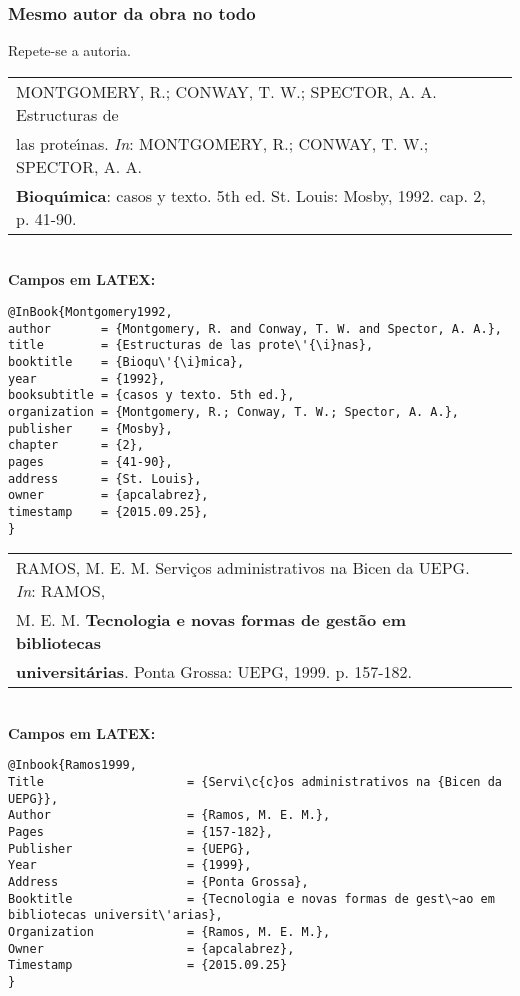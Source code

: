 \subsubsection{Mesmo autor da obra no todo}

Repete-se a autoria. \\

\begin{tabular}{|l|c|} \hline
	MONTGOMERY, R.; CONWAY, T. W.; SPECTOR, A. A. Estructuras de \\las prote\'{\i}nas.  \textit{In}: MONTGOMERY, R.; CONWAY, T. W.; SPECTOR, A. A. \\
	\textbf{Bioqu\'{\i}mica}: casos y texto. 5th ed. St. Louis:
	Mosby, 1992. cap. 2, p. 41-90.  \\\hline
\end{tabular} \\ 

\textbf{Campos em LATEX:} 

\begin{verbatim}
@InBook{Montgomery1992,
author       = {Montgomery, R. and Conway, T. W. and Spector, A. A.},
title        = {Estructuras de las prote\'{\i}nas},
booktitle    = {Bioqu\'{\i}mica},
year         = {1992},
booksubtitle = {casos y texto. 5th ed.},
organization = {Montgomery, R.; Conway, T. W.; Spector, A. A.},
publisher    = {Mosby},
chapter      = {2},
pages        = {41-90},
address      = {St. Louis},
owner        = {apcalabrez},
timestamp    = {2015.09.25},
}
\end{verbatim}

\begin{tabular}{|l|c|} \hline
	RAMOS, M. E. M. Servi\c{c}os administrativos na Bicen da UEPG. \textit{In}:
	RAMOS, \\
	M. E. M. \textbf{Tecnologia e novas formas de gest\~ao em bibliotecas} \\
		\textbf{universit\'arias}. Ponta Grossa: UEPG, 1999. p. 157-182.   \\\hline
\end{tabular} \\ 

\textbf{Campos em LATEX:} 

\begin{verbatim}
@Inbook{Ramos1999,
Title                    = {Servi\c{c}os administrativos na {Bicen da UEPG}},
Author                   = {Ramos, M. E. M.},
Pages                    = {157-182},
Publisher                = {UEPG},
Year                     = {1999},
Address                  = {Ponta Grossa},
Booktitle                = {Tecnologia e novas formas de gest\~ao em 
bibliotecas universit\'arias},
Organization             = {Ramos, M. E. M.}, 
Owner                    = {apcalabrez},
Timestamp                = {2015.09.25}
}
\end{verbatim}

